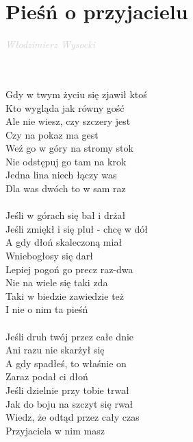 \documentclass[a5paper, 10pt]{book}
\begin{document}
\section{Pieśń o przyjacielu}\textcolor{lightgray}{\textit{Włodzimierz Wysocki}}\\~\\
\begin{minipage}[t]{0.5\textwidth}
~\\
Gdy w twym życiu się zjawił ktoś\\
Kto wygląda jak równy gość\\
Ale nie wiesz, czy szczery jest\\
Czy na pokaz ma gest\\
\hspace*{5mm}Weź go w góry na stromy stok\\
\hspace*{5mm}Nie odstępuj go tam na krok\\
\hspace*{5mm}Jedna lina niech łączy was\\
\hspace*{5mm}Dla was dwóch to w sam raz\\
\\
Jeśli w górach się bał i drżał\\
Jeśli zmiękł i się pluł - chcę w dół\\
A gdy dłoń skaleczoną miał\\
Wniebogłosy się darł\\
\hspace*{5mm}Lepiej pogoń go precz raz-dwa\\
\hspace*{5mm}Nie na wiele się taki zda\\
\hspace*{5mm}Taki w biedzie zawiedzie też\\
\hspace*{5mm}I nie o nim ta pieśń\\
\\
Jeśli druh twój przez całe dnie\\
Ani razu nie skarżył się\\
A gdy spadłeś, to właśnie on\\
Zaraz podał ci dłoń\\
\hspace*{5mm}Jeśli dzielnie przy tobie trwał\\
\hspace*{5mm}Jak do boju na szczyt się rwał\\
\hspace*{5mm}Wiedz, że odtąd przez cały czas\\
\hspace*{5mm}Przyjaciela w nim masz\\
\end{minipage}
\end{document}
